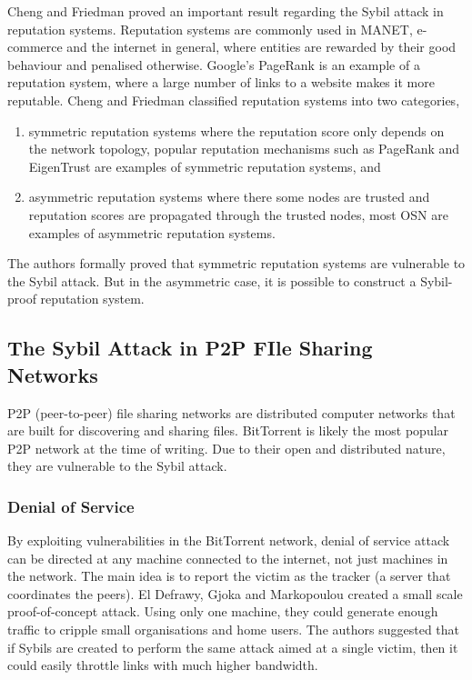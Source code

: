 Cheng and Friedman proved an important result regarding the Sybil attack in
reputation systems\cite{cheng2005sybilproof}. Reputation systems are commonly
used in MANET, e-commerce and the internet in general, where entities are
rewarded by their good behaviour and penalised otherwise. Google's
PageRank\cite{page1999pagerank} is an example of a reputation system, where a
large number of links to a website makes it more reputable. Cheng and Friedman
classified reputation systems into two categories,
\begin{enumerate}
\item symmetric reputation systems where the reputation score only depends on
  the network topology, popular reputation mechanisms such as
  PageRank\cite{page1999pagerank} and EigenTrust\cite{kamvar2003eigentrust} are
  examples of symmetric reputation systems, and
    \item asymmetric reputation systems where there some nodes are trusted and
      reputation scores are propagated through the trusted nodes, most OSN are
      examples of asymmetric reputation systems.
\end{enumerate}
The authors formally proved that symmetric reputation systems are vulnerable to
the Sybil attack. But in the asymmetric case, it is possible to construct a
Sybil-proof reputation system.

\subsection{The Sybil Attack in P2P FIle Sharing Networks}
P2P (peer-to-peer) file sharing networks are distributed computer networks that
are built for discovering and sharing files. BitTorrent\cite{bep3} is likely the
most popular P2P network at the time of writing. Due to their open and
distributed nature, they are vulnerable to the Sybil attack.

\subsubsection{Denial of Service}
By exploiting vulnerabilities in the BitTorrent network, denial of service
attack can be directed at any machine connected to the internet, not just
machines in the network\cite{sia2006ddos}. The main idea is to report the victim
as the tracker (a server that coordinates the peers). El Defrawy, Gjoka and
Markopoulou created a small scale proof-of-concept attack. Using only one
machine, they could generate enough traffic to cripple small organisations and
home users. The authors suggested that if Sybils are created to perform the same
attack aimed at a single victim, then it could easily throttle links with much
higher bandwidth\cite{el2007bottorrent}.

